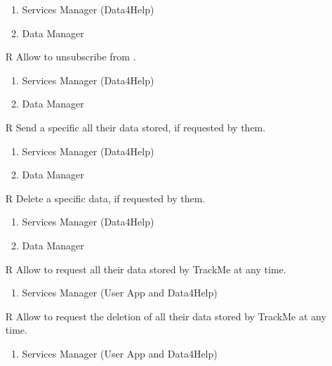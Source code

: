 \begin{itemize}
	\begin{enumerate}
		\item Services Manager (Data4Help)
		\item Data Manager
	\end{enumerate}
	\item[R\subs{31}]Allow  to unsubscribe from .
	\begin{enumerate}
		\item Services Manager (Data4Help)
		\item Data Manager
	\end{enumerate}
	\item[R\subs{32}]Send a specific  all their data stored, if requested by them.
	\begin{enumerate}
		\item Services Manager (Data4Help)
		\item Data Manager
	\end{enumerate}
	\item[R\subs{33}]Delete a  specific data, if requested by them.
	\begin{enumerate}
		\item Services Manager (Data4Help)
		\item Data Manager
	\end{enumerate}
	\item[R\subs{34}]Allow  to request all their data stored by TrackMe at any time.
	\begin{enumerate}
		\item Services Manager (User App and Data4Help)
	\end{enumerate}
	\item[R\subs{35}]Allow  to request the deletion of all their data stored by TrackMe at any time.
	\begin{enumerate}
		\item Services Manager (User App and Data4Help)
	\end{enumerate}
\end{itemize}


